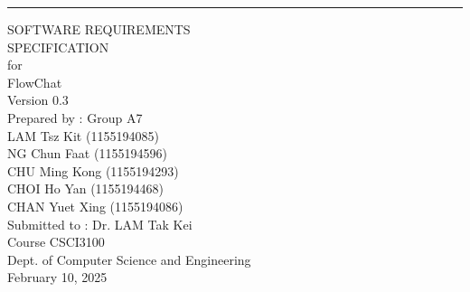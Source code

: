 \documentclass[a4paper,11pt]{scrreprt}
\def\myversion{0.3}
\def\submitdate{February 10, 2025}
\begin{document}
\begin{flushright}
    \rule{16cm}{5pt}\vskip1cm
    \begin{bfseries}
        \Huge{SOFTWARE REQUIREMENTS\\ SPECIFICATION}\\
        \vspace{1cm}
        for\\
        \vspace{1cm}
        FlowChat\\
        \vspace{1cm}
        \LARGE{Version \myversion}\\
        \vspace{1cm}
        Prepared by :  Group A7\\
        LAM Tsz Kit (1155194085)\\
        NG Chun Faat (1155194596)\\
        CHU Ming Kong (1155194293)\\
        CHOI Ho Yan (1155194468)\\
        CHAN Yuet Xing (1155194086)\\
        \vspace{1cm}
        Submitted to : Dr. LAM Tak Kei\\
        \vspace{1cm}
        Course CSCI3100\\
        Dept. of Computer Science and Engineering\\
        \vspace{1.cm}
        \submitdate
    \end{bfseries}
\end{flushright}

\tableofcontents
\end{document}
